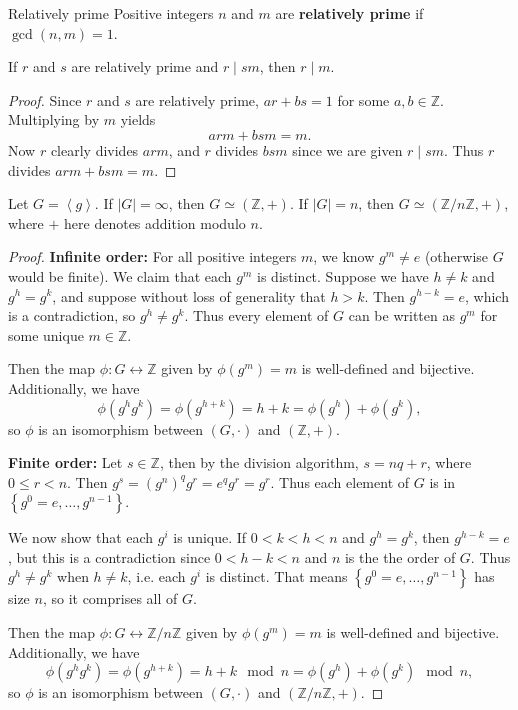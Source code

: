 \documentclass[10pt]{report}
\begin{document}
\begin{defn}{Relatively prime}{}
	Positive integers $n$ and $m$ are \textbf{relatively prime} if $\gcd(n,m)=1$.
\end{defn}

\begin{prop}
	If $r$ and $s$ are relatively prime and $r \;|\; sm$, then $r \;|\; m$.
\end{prop}
\begin{proof}
	Since $r$ and $s$ are relatively prime, $ar+bs=1$ for some $a,b \in \mathbb{Z}$. Multiplying by $m$ yields
	\[
	arm + bsm = m.
	\] Now $r$ clearly divides $arm$, and $r$ divides $bsm$ since we are given $r \;|\; sm$. Thus $r$ divides $arm+bsm=m$.
\end{proof}

\begin{thrm}{}{}
	Let $G = \left\langle g \right\rangle$. If $|G| = \infty$, then $G \simeq (\mathbb{Z}, +)$. If $|G| = n$, then $G \simeq (\mathbb{Z}/n\mathbb{Z}, +)$, where $+$ here denotes addition modulo $n$.
\end{thrm}
\begin{proof}
	\textbf{Infinite order:} For all positive integers $m$, we know $g^m \neq e$ (otherwise $G$ would be finite). We claim that each $g^m$ is distinct. Suppose we have $h \neq k$ and $g^h = g^k$, and suppose without loss of generality that $h > k$. Then $g^{h-k}=e$, which is a contradiction, so $g^h \neq g^k$. Thus every element of $G$ can be written as $g^m$ for some unique $m \in \mathbb{Z}$.

	Then the map $\phi: G \leftrightarrow \mathbb{Z}$ given by $\phi(g^m) = m$ is well-defined and bijective. Additionally, we have
	\[
		\phi(g^hg^k) = \phi(g^{h+k}) = h+k = \phi(g^h) + \phi(g^k),
	\] so $\phi$ is an isomorphism between $(G, \cdot)$ and $(\mathbb{Z}, +)$.

	\textbf{Finite order:} Let $s \in \mathbb{Z}$, then by the division algorithm, $s = nq+r$, where $0 \leq r < n$. Then $g^{s}=(g^n)^q g^r = e^q g^r = g^r$. Thus each element of $G$ is in $\left\{ g^0=e, \dots, g^{n-1} \right\}$.

	We now show that each $g^i$ is unique. If $0 < k < h< n$ and $g^h=g^k$, then $g^{h-k}=e$, but this is a contradiction since $0 <h-k < n$ and $n$ is the the order of $G$. Thus $g^h \neq g^k$ when $h \neq k$, i.e. each $g^i$ is distinct. That means $\left\{ g^0=e, \dots, g^{n-1} \right\}$ has size $n$, so it comprises all of $G$.

	Then the map $\phi: G \leftrightarrow \mathbb{Z}/n\mathbb{Z}$ given by $\phi(g^m)=m$ is well-defined and bijective. Additionally, we have
	\[
		\phi(g^h g^k) = \phi(g^{h+k}) = h+k \mod n = \phi(g^h) + \phi(g^k) \mod n,
	\] so $\phi$ is an isomorphism between $(G, \cdot)$ and $(\mathbb{Z}/n\mathbb{Z}, +)$.
\end{proof}
\end{document}
